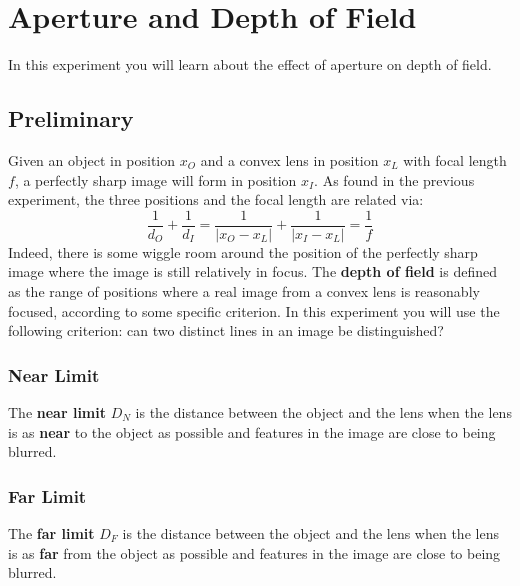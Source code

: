 \setcounter{chapter}{8}
\chapter{Aperture and Depth of Field}
In this experiment you will learn about the effect of aperture on depth of field.
\section{Preliminary}
Given an object in position $x_{O}$ and a convex lens in position $x_{L}$ with focal length $f$, a perfectly sharp image will form in position $x_{I}$. As found in the previous experiment, the three positions and the focal length are related via:
\begin{equation}
    \frac{1}{d_{O}} + \frac{1}{d_{I}} = \frac{1}{\vert x_{O} - x_{L} \vert} + \frac{1}{\vert x_{I} - x_{L} \vert} = \frac{1}{f}
\end{equation}
Indeed, there is some wiggle room around the position of the perfectly sharp image where the image is still relatively in focus. The \textbf{depth of field} is defined as the range of positions where a real image from a convex lens is reasonably focused, according to some specific criterion. In this experiment you will use the following criterion: can two distinct lines in an image be distinguished?
\subsection{Near Limit}
The \textbf{near limit} $D_{N}$ is the distance between the object and the lens when the lens is as \textbf{near} to the object as possible and features in the image are close to being blurred.
\subsection{Far Limit}
The \textbf{far limit} $D_{F}$ is the distance between the object and the lens when the lens is as \textbf{far} from the object as possible and features in the image are close to being blurred.
